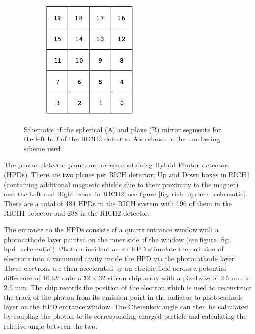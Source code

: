 \begin{figure}[htbp]
\begin{center}
\begin{subfigure}[b]{0.35\textwidth}
			\includegraphics[width=\textwidth]{Chapters/detector/rich/mirror_segmentation_rich2_plane.png}
			\caption{}
			\label{}
		\end{subfigure}
		\caption{Schematic of the spherical (A) and plane (B) mirror segments for the left half of the RICH2 detector. Also shown is the numbering scheme used}
		\label{fig: mirror_segmentation_rich2}
	\end{center}
\end{figure}

The photon detector planes are arrays containing Hybrid Photon detectors (HPDs). There are two planes per RICH detector; Up and Down boxes in RICH1 (containing additional magnetic shields due to their proximity to the magnet) and the Left and Right boxes in RICH2, see figure \ref{fig: rich_system_schematic}. There are a total of 484 HPDs in the RICH system with 196 of them in the RICH1 detector and 288 in the RICH2 detector. 

The entrance to the HPDs consists of a quartz entrance window with a photocathode layer painted on the inner side of the window (see figure \ref{fig: hpd_schematic}). Photons incident on an HPD stimulate the emission of electrons into a vacuumed cavity inside the HPD via the photocathode layer. These electrons are then accelerated by an electric field across a potential difference of 16 kV onto a 32 x 32 silicon chip array with a pixel size of 2.5 mm x 2.5 mm. The chip records the position of the electron which is used to reconstruct the track of the photon from its emission point in the radiator to photocathode layer on the HPD entrance window. The Cherenkov angle can then be calculated by coupling the photon to its corresponding charged particle and calculating the relative angle between the two.

